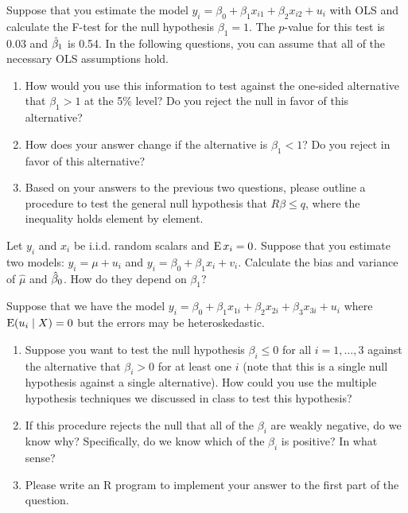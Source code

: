 \begin{hw}
  Suppose that you estimate the model $y_i = \beta_0 + \beta_1 x_{i1}
  + \beta_2 x_{i2} + u_i$ with OLS and calculate the F-test for the
  null hypothesis $\beta_1 = 1$. The $p$-value for this test is
  $0.03$ and $\hat{\beta}_1$ is 0.54. In the following questions, you can
  assume that all of the necessary OLS assumptions hold.

  \begin{enumerate}
  \item How would you use this information to test against the
    one-sided alternative that $\beta_1 > 1$ at the 5\% level? Do you
    reject the null in favor of this alternative?
  \item How does your answer change if the alternative is $\beta_1 <
    1$? Do you reject in favor of this alternative?
  \item Based on your answers to the previous two questions, please
    outline a procedure to test the general null hypothesis that
    $R\beta \leq q$, where the inequality holds element by element.
  \end{enumerate}
\end{hw}

\begin{hw}
  Let $y_i$ and $x_i$ be i.i.d. random scalars and $\operatorname{E} x_i = 0$.
  Suppose that you estimate two models: $y_i = \mu + u_i$ and $y_i =
  \beta_0 + \beta_1 x_i + v_i.$ Calculate the bias and variance of
  $\hat \mu$ and $\hat{\beta}_0$. How do they depend on $\beta_1$?
\end{hw}

\begin{hw}
  Suppose that we have the model $y_i = \beta_0 + \beta_1 x_{1i} +
  \beta_2 x_{2i} + \beta_3 x_{3i} + u_i$ where $\operatorname{E}(u_i \mid X) = 0$
  but the errors may be heteroskedastic.

  \begin{enumerate}
  \item Suppose you want to test the null hypothesis $\beta_i \leq 0$
    for all $i = 1,\dots,3$ against the alternative that $\beta_i > 0$
    for at least one $i$ (note that this is a single null hypothesis
    against a single alternative). How could you use the multiple
    hypothesis techniques we discussed in class to test this
    hypothesis?
  \item If this procedure rejects the null that all of the $\beta_i$
    are weakly negative, do we know why? Specifically, do we know
    which of the $\beta_i$ is positive? In what sense?
  \item Please write an R program to implement your answer to the
    first part of the question.
  \end{enumerate}
\end{hw}


